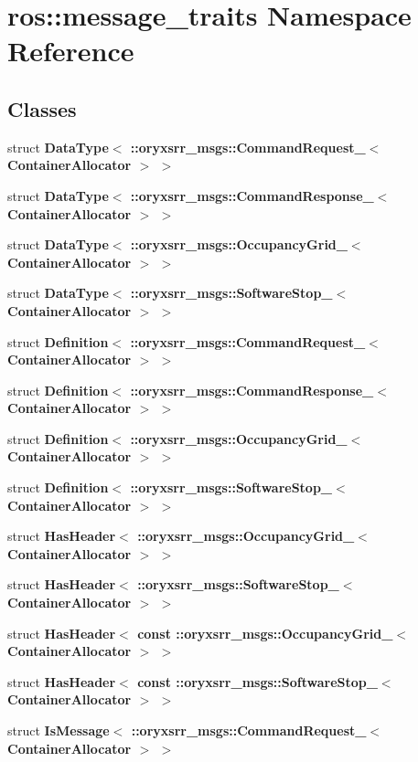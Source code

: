 \section{ros\-:\-:message\-\_\-traits \-Namespace \-Reference}
\label{namespaceros_1_1message__traits}
\subsection*{\-Classes}
\begin{DoxyCompactItemize}
\item 
struct {\bf \-Data\-Type$<$ \-::oryxsrr\-\_\-msgs\-::\-Command\-Request\-\_\-$<$ Container\-Allocator $>$ $>$}
\item 
struct {\bf \-Data\-Type$<$ \-::oryxsrr\-\_\-msgs\-::\-Command\-Response\-\_\-$<$ Container\-Allocator $>$ $>$}
\item 
struct {\bf \-Data\-Type$<$ \-::oryxsrr\-\_\-msgs\-::\-Occupancy\-Grid\-\_\-$<$ Container\-Allocator $>$ $>$}
\item 
struct {\bf \-Data\-Type$<$ \-::oryxsrr\-\_\-msgs\-::\-Software\-Stop\-\_\-$<$ Container\-Allocator $>$ $>$}
\item 
struct {\bf \-Definition$<$ \-::oryxsrr\-\_\-msgs\-::\-Command\-Request\-\_\-$<$ Container\-Allocator $>$ $>$}
\item 
struct {\bf \-Definition$<$ \-::oryxsrr\-\_\-msgs\-::\-Command\-Response\-\_\-$<$ Container\-Allocator $>$ $>$}
\item 
struct {\bf \-Definition$<$ \-::oryxsrr\-\_\-msgs\-::\-Occupancy\-Grid\-\_\-$<$ Container\-Allocator $>$ $>$}
\item 
struct {\bf \-Definition$<$ \-::oryxsrr\-\_\-msgs\-::\-Software\-Stop\-\_\-$<$ Container\-Allocator $>$ $>$}
\item 
struct {\bf \-Has\-Header$<$ \-::oryxsrr\-\_\-msgs\-::\-Occupancy\-Grid\-\_\-$<$ Container\-Allocator $>$ $>$}
\item 
struct {\bf \-Has\-Header$<$ \-::oryxsrr\-\_\-msgs\-::\-Software\-Stop\-\_\-$<$ Container\-Allocator $>$ $>$}
\item 
struct {\bf \-Has\-Header$<$ const \-::oryxsrr\-\_\-msgs\-::\-Occupancy\-Grid\-\_\-$<$ Container\-Allocator $>$ $>$}
\item 
struct {\bf \-Has\-Header$<$ const \-::oryxsrr\-\_\-msgs\-::\-Software\-Stop\-\_\-$<$ Container\-Allocator $>$ $>$}
\item 
struct {\bf \-Is\-Message$<$ \-::oryxsrr\-\_\-msgs\-::\-Command\-Request\-\_\-$<$ Container\-Allocator $>$ $>$}

\end{DoxyCompactItemize}
